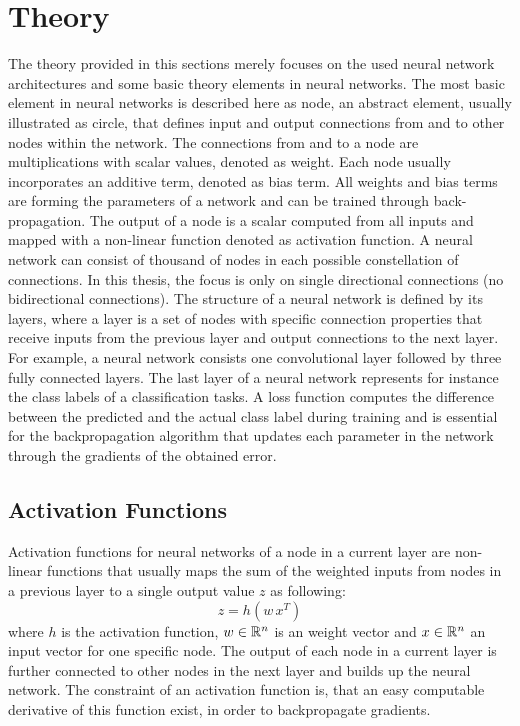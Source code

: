 
\section{Theory}\label{sec:nn_theory}
\thesisStateNotReady
The theory provided in this sections merely focuses on the used neural network architectures and some basic theory elements in neural networks.
The most basic element in neural networks is described here as node, an abstract element, usually illustrated as circle, that defines input and output connections from and to other nodes within the network.
The connections from and to a node are multiplications with scalar values, denoted as weight.
Each node usually incorporates an additive term, denoted as bias term.
All weights and bias terms are forming the parameters of a network and can be trained through back-propagation.
The output of a node is a scalar computed from all inputs and mapped with a non-linear function denoted as activation function.
A neural network can consist of thousand of nodes in each possible constellation of connections.
In this thesis, the focus is only on single directional connections (no bidirectional connections).
The structure of a neural network is defined by its layers, where a layer is a set of nodes with specific connection properties that receive inputs from the previous layer and output connections to the next layer.
For example, a neural network consists one convolutional layer followed by three fully connected layers.
The last layer of a neural network represents for instance the class labels of a classification tasks.
A loss function computes the difference between the predicted and the actual class label during training and is essential for the backpropagation algorithm that updates each parameter in the network through the gradients of the obtained error.



\subsection{Activation Functions}\label{sec:nn_theory_acti}
Activation functions for neural networks of a node in a current layer are non-linear functions that usually maps the sum of the weighted inputs from nodes in a previous layer to a single output value $z$ as following:
\begin{equation}\label{eq:nn_theory_acti}
  z = h(w \, x^T)
\end{equation}
where $h$ is the activation function, $w \in \mathbb{R}^n$ is an weight vector and $x \in \mathbb{R}^n$ an input vector for one specific node.
The output of each node in a current layer is further connected to other nodes in the next layer and builds up the neural network.
The constraint of an activation function is, that an easy computable derivative of this function exist, in order to backpropagate gradients.

